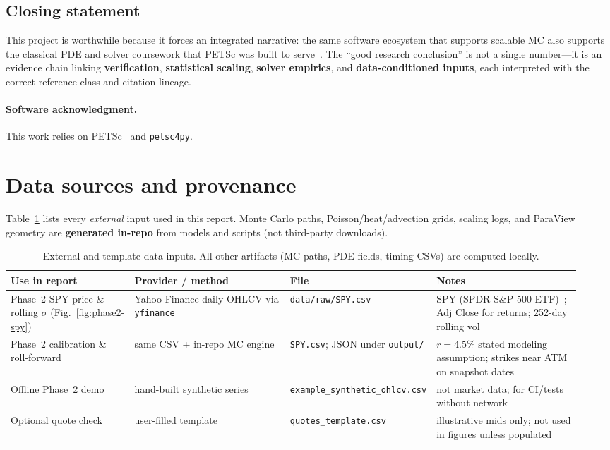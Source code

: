 \documentclass[11pt]{article}
\begin{document}
\subsection{Closing statement}
This project is worthwhile because it forces an integrated narrative: the same
software ecosystem that supports scalable MC also supports the classical PDE and
solver coursework that PETSc was built to serve~\cite{bueler2020petsc,petsc-user-ref}.
The ``good research conclusion'' is not a single number---it is an evidence chain
linking \textbf{verification}, \textbf{statistical scaling}, \textbf{solver
empirics}, and \textbf{data-conditioned inputs}, each interpreted with the correct
reference class and citation lineage.

\paragraph{Software acknowledgment.}
This work relies on PETSc~\cite{petsc-user-ref,petsc-efficient} and \texttt{petsc4py}.

\section{Data sources and provenance}
\label{sec:data-sources}

Table~\ref{tab:data-sources} lists every \emph{external} input used in this report.
Monte Carlo paths, Poisson/heat/advection grids, scaling logs, and ParaView geometry
are \textbf{generated in-repo} from models and scripts (not third-party downloads).

\begin{table}[ht]
  \centering
  \footnotesize
  \begin{tabular}{@{}p{0.22\linewidth}p{0.28\linewidth}p{0.18\linewidth}p{0.26\linewidth}@{}}
    \toprule
    \textbf{Use in report} & \textbf{Provider / method} & \textbf{File} & \textbf{Notes} \\
    \midrule
  Phase~2 SPY price \& rolling $\sigma$ (Fig.~\ref{fig:phase2-spy}) &
  Yahoo Finance daily OHLCV via \texttt{yfinance}~\cite{yfinance,yahoofinance} &
  \texttt{data/raw/SPY.csv} &
  SPY (SPDR S\&P 500 ETF)~\cite{spy-etf}; Adj Close for returns; 252-day rolling vol \\
  Phase~2 calibration \& roll-forward &
  same CSV + in-repo MC engine &
  \texttt{SPY.csv}; JSON under \texttt{output/} &
  $r{=}4.5\%$ stated modeling assumption; strikes near ATM on snapshot dates \\
  Offline Phase~2 demo &
  hand-built synthetic series &
  \texttt{example\_synthetic\_ohlcv.csv} &
  not market data; for CI/tests without network \\
  Optional quote check &
  user-filled template &
  \texttt{quotes\_template.csv} &
  illustrative mids only; not used in figures unless populated \\
    \bottomrule
  \end{tabular}
  \caption{External and template data inputs. All other artifacts (MC paths, PDE fields, timing CSVs) are computed locally.}
  \label{tab:data-sources}
\end{table}
\end{document}

